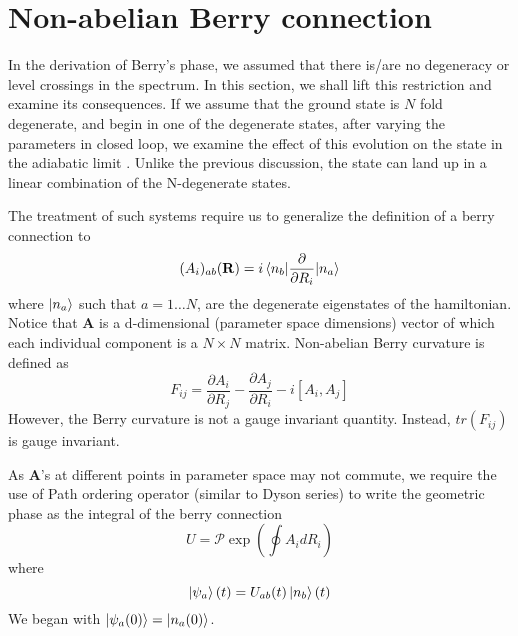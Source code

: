 \section{Non-abelian Berry connection}
In the derivation of Berry's phase, we assumed that there is/are no degeneracy or level crossings in the spectrum. In this section, we shall lift this restriction and examine its
consequences. If we assume that the ground state is $N$ fold degenerate, and begin in one of the degenerate states, after varying the parameters in closed loop, we examine the effect 
of this evolution on the state in the adiabatic limit \cite{wilczek1984appearance}. Unlike the previous discussion, the state can land up in a linear combination of the N-degenerate states.

The treatment of such systems require us to generalize the definition of a berry connection to
\begin{equation}
 (A_{i})_{ab}(\mathbf{R}) = i \braket{n_{b} | \frac{\partial}{\partial R_{i}} | n_{a}}
\end{equation} where $\ket{n_{a}}$ such that $a=1\dots N$, are the degenerate eigenstates of the hamiltonian. Notice that $\mathbf{A}$ is a d-dimensional (parameter space dimensions) vector of which
each individual component is a $N \times N$ matrix. 
Non-abelian Berry curvature is defined as 
\begin{equation}
 F_{ij} = \frac{\partial A_{i}}{\partial R_{j}} - \frac{\partial A_{j}}{\partial R_{i}} - i[A_{i}, A_{j}]
\end{equation} However, the Berry curvature is not a gauge invariant quantity. Instead, $tr(F_{ij})$ is gauge invariant.

As $\mathbf{A}$'s at different points in parameter space may not commute, we require the use of Path ordering operator (similar to Dyson series) to write the geometric phase 
as the integral of the berry connection
\begin{equation}
 U = \mathcal{P}\exp\left(\oint A_{i}dR_{i}\right)
\end{equation}
where \begin{equation}
       \ket{\psi_{a}}(t) = U_{ab}(t) \ket{n_{b}}(t)
      \end{equation}
We began with $\ket{\psi_{a}(0)} = \ket{n_{a}(0)}$.

